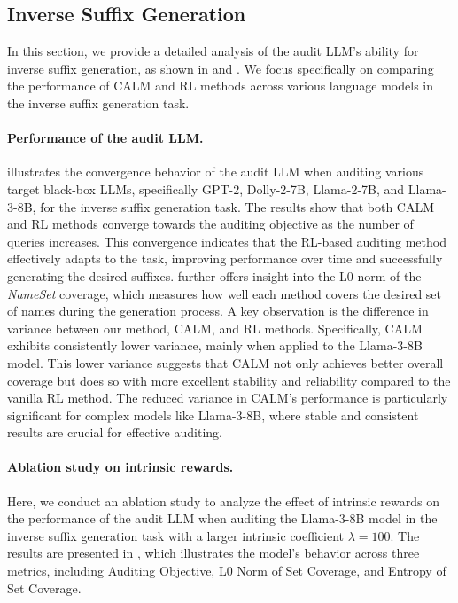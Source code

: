 \documentclass[letterpaper]{article} %
\newcommand{\ours}{\textsf{CALM}}
\begin{document}
\subsection{Inverse Suffix Generation}
In this section, we provide a detailed analysis of the audit LLM's ability for inverse suffix generation, as shown in  and . We focus specifically on comparing the performance of {\ours} and RL methods across various language models in the inverse suffix generation task.

\paragraph{Performance of the audit LLM.}  illustrates the convergence behavior of the audit LLM when auditing various target black-box LLMs, specifically GPT-2, Dolly-2-7B, Llama-2-7B, and Llama-3-8B, for the inverse suffix generation task. The results show that both {\ours} and RL methods converge towards the auditing objective as the number of queries increases. This convergence indicates that the RL-based auditing method effectively adapts to the task, improving performance over time and successfully generating the desired suffixes.
 further offers insight into the L0 norm of the \textit{NameSet} coverage, which measures how well each method covers the desired set of names during the generation process. A key observation is the difference in variance between our method, {\ours}, and RL methods. Specifically, {\ours} exhibits consistently lower variance, mainly when applied to the Llama-3-8B model. This lower variance suggests that {\ours} not only achieves better overall coverage but does so with more excellent stability and reliability compared to the vanilla RL method. The reduced variance in {\ours}'s performance is particularly significant for complex models like Llama-3-8B, where stable and consistent results are crucial for effective auditing.

\paragraph{Ablation study on intrinsic rewards.} Here, we conduct an ablation study to analyze the effect of intrinsic rewards on the performance of the audit LLM when auditing the Llama-3-8B model in the inverse suffix generation task with a larger intrinsic coefficient $\lambda=100$. The results are presented in , which illustrates the model's behavior across three metrics, including Auditing Objective, L0 Norm of Set Coverage, and Entropy of Set Coverage.
\end{document}
